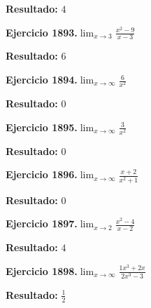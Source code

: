 \documentclass[10pt,a4paper]{article}
\begin{document}
\begin{solbox}
\textbf{Resultado:} \(\displaystyle 4\)
\end{solbox}

\begin{ejbox}
\textbf{Ejercicio 1893.}\quad $\lim_{x\to 3} \frac{x^2-9}{x-3}$
\end{ejbox}

\begin{solbox}
\textbf{Resultado:} \(\displaystyle 6\)
\end{solbox}

\newpage
\begin{ejbox}
\textbf{Ejercicio 1894.}\quad $\lim_{x\to \infty} \frac{6}{x^2}$
\end{ejbox}

\begin{solbox}
\textbf{Resultado:} \(\displaystyle 0\)
\end{solbox}

\begin{ejbox}
\textbf{Ejercicio 1895.}\quad $\lim_{x\to \infty} \frac{3}{x^2}$
\end{ejbox}

\begin{solbox}
\textbf{Resultado:} \(\displaystyle 0\)
\end{solbox}

\begin{ejbox}
\textbf{Ejercicio 1896.}\quad $\lim_{x\to \infty} \frac{x + 2}{x^2 + 1}$
\end{ejbox}

\begin{solbox}
\textbf{Resultado:} \(\displaystyle 0\)
\end{solbox}

\newpage
\begin{ejbox}
\textbf{Ejercicio 1897.}\quad $\lim_{x\to 2} \frac{x^2-4}{x-2}$
\end{ejbox}

\begin{solbox}
\textbf{Resultado:} \(\displaystyle 4\)
\end{solbox}

\begin{ejbox}
\textbf{Ejercicio 1898.}\quad $\lim_{x\to \infty} \frac{1x^3 + 2x}{2x^3 - 3}$
\end{ejbox}

\begin{solbox}
\textbf{Resultado:} \(\displaystyle \frac{1}{2}\)
\end{solbox}
\end{document}
